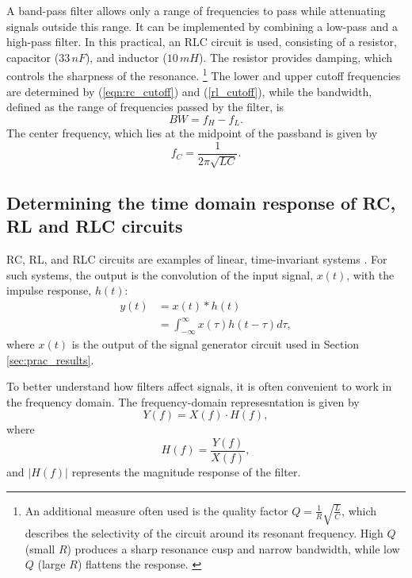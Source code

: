 \documentclass[a4paper, onecolumn, 12pt]{IEEEtran}
\begin{document}
A band-pass filter allows only a range of frequencies to pass while attenuating signals outside this range. It can be implemented by combining a low-pass and a high-pass filter. In this practical, an RLC circuit is used, consisting of a resistor, capacitor ($33\,nF$), and inductor ($10\,mH$). The resistor provides damping, which controls the sharpness of the resonance. \footnote{An additional measure often used is the quality factor $Q = \tfrac{1}{R}\sqrt{\tfrac{L}{C}}$, 
which describes the selectivity of the circuit around its resonant frequency. 
High $Q$ (small $R$) produces a sharp resonance cusp and narrow bandwidth, 
while low $Q$ (large $R$) flattens the response. \cite{lathi}} The lower and upper cutoff frequencies are determined by (\ref{eqn:rc_cutoff}) and (\ref{rl_cutoff}), while the bandwidth, defined as the range of frequencies passed by the filter, is
\begin{equation}
  \label{eqn:rlc_bw}
  BW = f_H - f_L.
\end{equation}
The center frequency, which lies at the midpoint of the passband is given by
\begin{equation}
  \label{eqn:rlc_center}
  f_C = \frac{1}{2 \pi \sqrt{LC}}.
\end{equation}

\subsection{Determining the time domain response of RC, RL and RLC circuits}
\label{subsec:ht_hf}

RC, RL, and RLC circuits are examples of linear, time-invariant systems \cite{lathi}. For such systems, the output is the convolution of the input signal, $x(t)$, with the impulse response, $h(t)$:
\begin{align}
  y(t) &= x(t) \ast h(t)\nonumber\\ 
       &= \int_{-\infty}^{\infty}x(\tau)h(t-\tau)d\tau,
\end{align}
where $x(t)$ is the output of the signal generator circuit used in Section \ref{sec:prac_results}. 

To better understand how filters affect signals, it is often convenient to work in the frequency domain. The frequency-domain represesntation is given by
\begin{equation}
  Y(f) = X(f) \cdot H(f),
\end{equation}
where
\begin{equation}
  \label{eqn:Hf}
  H(f) = \frac{Y(f)}{X(f)},
\end{equation}
and $|H(f)|$ represents the magnitude response of the filter.
\end{document}

